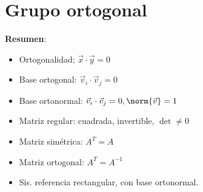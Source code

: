 \documentclass{./Geometria.tex}
\begin{document}
\chapter{Grupo ortogonal}
\textbf{Resumen}:
\begin{itemize}
    \item Ortogonalidad; \(\vec{x} \cdot \vec{y} = 0\)
    \item Base ortogonal: \(\vec{v}_i \cdot \vec{v}_j = 0\)
    \item Base ortonormal: \(\vec{v}_i \cdot \vec{v}_j = 0, \norm{\vec{v}} = 1\)
    \item Matriz regular: cuadrada, invertible, \(\det \neq 0\)
    \item Matriz simétrica: \(A^{T} = A\)
    \item Matriz ortogonal: \(A^{T} = A^{-1}\)
    \item Sis. referencia rectangular, con base ortonormal.
\end{itemize}
\end{document}
